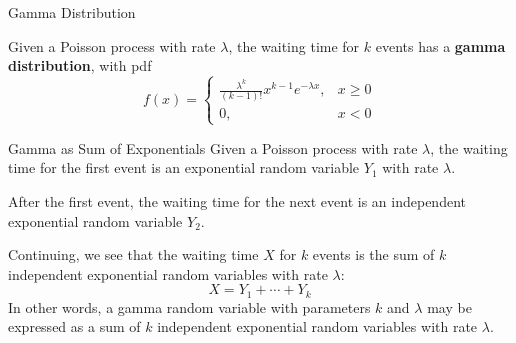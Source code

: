 \documentclass{beamer}
\renewcommand{\emph}{\textbf}
\begin{document}
\begin{frame}{Gamma Distribution}
\begin{block}{}
Given a Poisson process with rate $\lambda$, the waiting time for $k$ events has a \emph{gamma distribution}, with pdf
$$f(x) =\begin{cases} \frac{\lambda^k}{(k-1)!}x^{k-1}e^{-\lambda x}, & x\geq 0 \\ 0, & x<0\end{cases}$$
\end{block}

\vspace{.2cm}

\end{frame}

\begin{frame}{Gamma as Sum of Exponentials}
Given a Poisson process with rate $\lambda$, the waiting time for the first event is an exponential random variable $Y_1$ with rate $\lambda$. 

\vspace{.2cm}
\pause
After the first event, the waiting time for the next event is an independent exponential random variable $Y_2$.

\vspace{.2cm}
\pause
Continuing, we see that the waiting time $X$ for $k$ events is the sum of $k$ independent exponential random variables with rate $\lambda$:
$$X=Y_1+\cdots+Y_k$$
\pause In other words, a gamma random variable with parameters $k$ and $\lambda$ may be expressed as a sum of $k$ independent exponential random variables with rate $\lambda$.
\end{frame}
\end{document}
